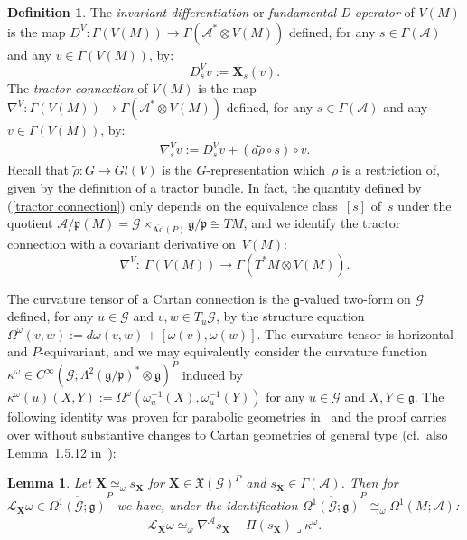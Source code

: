 \documentclass[pdftex]{sigma}
\def\k{\kappa}
\def\g{\mathfrak{g}}
\def\p{\mathfrak{p}}
\def\Abdle{\mathcal{A}}
\def\Gbdle{\mathcal{G}}
\def\VF{\mathfrak{X}}
\def\:{\lrcorner}
\def\tens{\otimes}
\def\isom{\cong}
\theoremstyle{plain}
\newtheorem{Lemma}[Theorem]{Lemma}
\theoremstyle{definition}
\newtheorem{Definition}{Definition}[section]
\begin{document}
\begin{Definition} \label{differentiation} The \textit{invariant differentiation} or \textit{fundamental D-operator} of $V(M)$ is the map $D^{V} : \Gamma(V(M)) \rightarrow \Gamma(\Abdle^* \tens V(M))$ def\/ined, for any $s \in \Gamma(\Abdle)$ and any $v \in \Gamma(V(M))$, by:
\[
D_s^{V}v := \mathbf{X}_s(v).
\]
The \textit{tractor connection} of $V(M)$ is the map $\nabla^{V}: \Gamma(V(M)) \rightarrow \Gamma(\Abdle^* \tens V(M))$ def\/ined, for any $s \in \Gamma(\Abdle)$ and any $v \in \Gamma(V(M))$, by:
\begin{gather}
\nabla^{V}_s v := D^{V}_s v + (d\tilde{\rho} \circ s) \circ v. \label{tractor connection}
\end{gather}
 Recall that $\tilde{\rho}: G \rightarrow Gl(V)$ is the $G$-representation which~$\rho$ is a restriction of, given by the def\/inition of a tractor bundle. In fact, the quantity def\/ined by (\ref{tractor connection}) only depends on the equiva\-len\-ce class~$[s]$ of~$s$ under the quotient $\Abdle/\p(M) = \Gbdle \times_{\overline{\mathrm{Ad}}(P)} \g/\p \isom TM$, and we identify the tractor connection with a covariant derivative on~$V(M)$:
\[
\nabla^V: \ \Gamma(V(M)) \rightarrow \Gamma(T^*M \tens V(M)).
\]
\end{Definition}

The curvature tensor of a Cartan connection is the $\g$-valued two-form on $\Gbdle$ def\/ined, for any $u \in \Gbdle$ and $v, w \in T_u\Gbdle$, by the structure equation $\Omega^{\omega}(v,w) := d\omega(v,w) + [\omega(v),\omega(w)]$. The curvature tensor is horizontal and $P$-equivariant, and we may equivalently consider the curvature function $\kappa^{\omega} \in C^{\infty}(\Gbdle;\Lambda^2(\g/\p)^* \tens \g)^P$ induced by $\kappa^{\omega}(u)(X,Y) := \Omega^{\omega}(\omega_u^{-1}(X),\omega_u^{-1}(Y))$ for any $u \in \Gbdle$ and $X,Y \in \g$. The following identity was proven for parabolic geometries in~\cite{Cap inf aut} and the proof carries over without substantive changes to Cartan geometries of general type (cf.\ also Lemma~1.5.12 in~\cite{CSbook}):

\begin{Lemma} \label{infinitesimal deformation} Let $\mathbf{X} \simeq_{\omega} s_{\mathbf{X}}$ for $\mathbf{X} \in \VF(\Gbdle)^P$ and $s_{\mathbf{X}} \in \Gamma(\Abdle)$. Then for $\mathcal{L}_{\mathbf{X}} \omega \in \overline{\Omega^1(\Gbdle;\g)}^P$ we have, under the identification $\overline{\Omega^1(\Gbdle;\g)}^P \isom_{\omega} \Omega^1(M;\Abdle)$:
\begin{gather}
\mathcal{L}_{\mathbf{X}} \omega \simeq_{\omega} \nabla^{\Abdle} s_{\mathbf{X}} + \Pi(s_{\mathbf{X}}) \: \k^{\omega}. \label{infinitesimal deformation identity}
\end{gather}
\end{Lemma}
\end{document}

